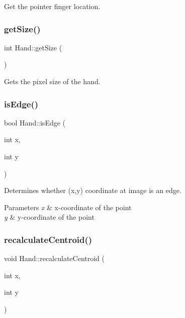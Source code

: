 Get the pointer finger location. 

\hypertarget{class_hand_abd15e5110f6a2f0809e2064c808a829c}{}\label{class_hand_abd15e5110f6a2f0809e2064c808a829c} 
\subsubsection{\texorpdfstring{get\+Size()}{getSize()}}
{\footnotesize\ttfamily int Hand\+::get\+Size (\begin{DoxyParamCaption}{ }\end{DoxyParamCaption})}



Gets the pixel size of the hand. 

\hypertarget{class_hand_a3c9f87cf116838082875016e459127ae}{}\label{class_hand_a3c9f87cf116838082875016e459127ae} 
\subsubsection{\texorpdfstring{is\+Edge()}{isEdge()}}
{\footnotesize\ttfamily bool Hand\+::is\+Edge (\begin{DoxyParamCaption}\item[{int}]{x,  }\item[{int}]{y }\end{DoxyParamCaption})\hspace{0.3cm}{\ttfamily [protected]}}



Determines whether (x,y) coordinate at image is an edge. 


\begin{DoxyParams}{Parameters}
{\em x} & x-\/coordinate of the point \\
\hline
{\em y} & y-\/coordinate of the point \\
\hline
\end{DoxyParams}
\hypertarget{class_hand_a8d3f0317f1b0e2edd9e89d679e616fbc}{}\label{class_hand_a8d3f0317f1b0e2edd9e89d679e616fbc} 
\subsubsection{\texorpdfstring{recalculate\+Centroid()}{recalculateCentroid()}}
{\footnotesize\ttfamily void Hand\+::recalculate\+Centroid (\begin{DoxyParamCaption}\item[{int}]{x,  }\item[{int}]{y }\end{DoxyParamCaption})\hspace{0.3cm}{\ttfamily [protected]}}



